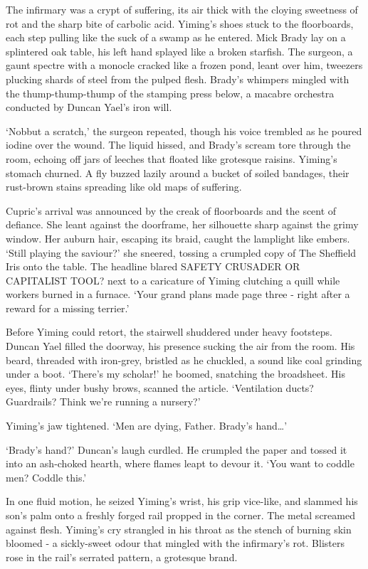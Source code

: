The infirmary was a crypt of suffering, its air thick with the cloying sweetness of rot and the sharp bite of carbolic acid. Yiming's shoes stuck to the floorboards, each step pulling like the suck of a swamp as he entered. Mick Brady lay on a splintered oak table, his left hand splayed like a broken starfish. The surgeon, a gaunt spectre with a monocle cracked like a frozen pond, leant over him, tweezers plucking shards of steel from the pulped flesh. Brady's whimpers mingled with the thump-thump-thump of the stamping press below, a macabre orchestra conducted by Duncan Yael's iron will.

`Nobbut a scratch,' the surgeon repeated, though his voice trembled as he poured iodine over the wound. The liquid hissed, and Brady's scream tore through the room, echoing off jars of leeches that floated like grotesque raisins. Yiming's stomach churned. A fly buzzed lazily around a bucket of soiled bandages, their rust-brown stains spreading like old maps of suffering.

Cupric's arrival was announced by the creak of floorboards and the scent of defiance. She leant against the doorframe, her silhouette sharp against the grimy window. Her auburn hair, escaping its braid, caught the lamplight like embers. `Still playing the saviour?' she sneered, tossing a crumpled copy of The Sheffield Iris onto the table. The headline blared SAFETY CRUSADER OR CAPITALIST TOOL? next to a caricature of Yiming clutching a quill while workers burned in a furnace. `Your grand plans made page three - right after a reward for a missing terrier.'

Before Yiming could retort, the stairwell shuddered under heavy footsteps. Duncan Yael filled the doorway, his presence sucking the air from the room. His beard, threaded with iron-grey, bristled as he chuckled, a sound like coal grinding under a boot. `There's my scholar!' he boomed, snatching the broadsheet. His eyes, flinty under bushy brows, scanned the article. `Ventilation ducts? Guardrails? Think we're running a nursery?'

Yiming's jaw tightened. `Men are dying, Father. Brady's hand\dots'

`Brady's hand?' Duncan's laugh curdled. He crumpled the paper and tossed it into an ash-choked hearth, where flames leapt to devour it. `You want to coddle men? Coddle this.'

In one fluid motion, he seized Yiming's wrist, his grip vice-like, and slammed his son's palm onto a freshly forged rail propped in the corner. The metal screamed against flesh. Yiming's cry strangled in his throat as the stench of burning skin bloomed - a sickly-sweet odour that mingled with the infirmary's rot. Blisters rose in the rail's serrated pattern, a grotesque brand.

